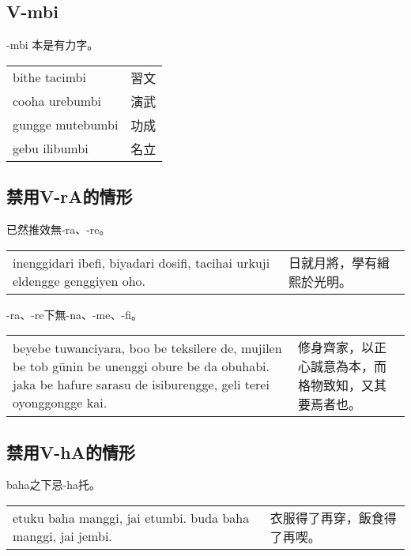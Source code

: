 \documentclass{article}
\begin{document}
\subsection{V-mbi}
\noindent -mbi 本是有力字。
\begin{center}
    \begin{tabularx}{\textwidth}{XX}
        bithe tacimbi & 習文\\
        cooha urebumbi & 演武\\
        gungge mutebumbi & 功成\\
        gebu ilibumbi & 名立
    \end{tabularx}
\end{center}

\subsection{禁用V-rA的情形}
\noindent 已然推效無-ra、-re。
\begin{center}
    \begin{tabularx}{\textwidth}{XX}
        inenggidari ibefi, biyadari dosifi, tacihai urkuji eldengge genggiyen oho. & 日就月將，學有緝熙於光明。
    \end{tabularx}
\end{center}

\noindent -ra、-re下無-na、-me、-fi。
\begin{center}
    \begin{tabularx}{\textwidth}{XX}
        beyebe tuwanciyara, boo be teksilere de, mujilen be tob g\={u}nin be unenggi obure be da obuhabi. jaka be hafure sarasu de isiburengge, geli terei oyonggongge kai. & 修身齊家，以正心誠意為本，而格物致知，又其要焉者也。
    \end{tabularx}
\end{center}

\subsection{禁用V-hA的情形}
\noindent baha之下忌-ha托。
\begin{center}
    \begin{tabularx}{\textwidth}{XX}
        etuku baha manggi, jai etumbi. buda baha manggi, jai jembi. & 衣服得了再穿，飯食得了再喫。
    \end{tabularx}
\end{center}
\end{document}

